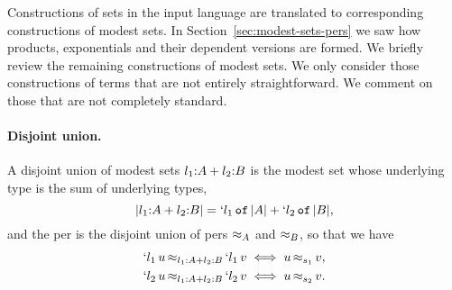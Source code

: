 Constructions of sets in the input language are translated to
corresponding constructions of modest sets.
%
\iflong
In Section~\ref{sec:modest-sets-pers} we saw how products,
exponentials and their dependent versions are formed. We briefly
review the remaining constructions of modest sets. We only consider
those constructions of terms that are not entirely straightforward.
%
\else
%
We comment on those that are not completely standard.
%
\fi

\iflong
\paragraph{Disjoint union.}
%
A disjoint union of modest sets $\isum{\il_1}{A}{\il_2}{B}$ is the
modest set whose underlying type is the sum of underlying types,
%
\begin{equation*}
  \typeOf{\isum{\il_1}{A}{\il_2}{B}} =
  \osumtyx{\il_1}{\typeOf{A}}{\il_2}{\typeOf{B}},
\end{equation*}
%
and the per is the disjoint union of pers $\per_{A}$ and $\per_{B}$, so
that we have
%
\begin{align*}
  \oper{\isum{\il_1}{A}{\il_2}{B}}{\oinj{\il_1}{u}}{\oinj{\il_1}{v}}
  &\iff \oper{s_1}{u}{v},
  \\
  \oper{\isum{\il_1}{A}{\il_2}{B}}{\oinj{\il_2}{u}}{\oinj{\il_2}{v}}
  &\iff \oper{s_2}{u}{v}.
\end{align*}
\fi %

